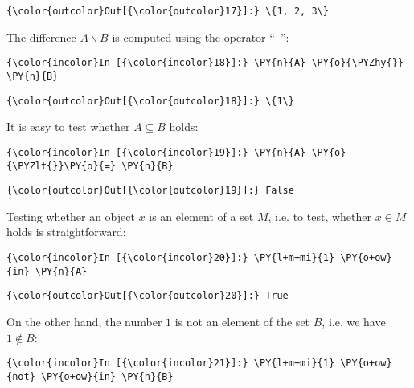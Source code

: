\begin{Verbatim}[commandchars=\\\{\}]
{\color{outcolor}Out[{\color{outcolor}17}]:} \{1, 2, 3\}
\end{Verbatim}       
The difference \(A \backslash B\) is computed using the operator ``\texttt{-}'':

\begin{Verbatim}[commandchars=\\\{\}]
{\color{incolor}In [{\color{incolor}18}]:} \PY{n}{A} \PY{o}{\PYZhy{}} \PY{n}{B}
\end{Verbatim}

\begin{Verbatim}[commandchars=\\\{\}]
{\color{outcolor}Out[{\color{outcolor}18}]:} \{1\}
\end{Verbatim}           
It is easy to test whether \(A \subseteq B\) holds:

\begin{Verbatim}[commandchars=\\\{\}]
{\color{incolor}In [{\color{incolor}19}]:} \PY{n}{A} \PY{o}{\PYZlt{}}\PY{o}{=} \PY{n}{B}
\end{Verbatim}

\begin{Verbatim}[commandchars=\\\{\}]
{\color{outcolor}Out[{\color{outcolor}19}]:} False
\end{Verbatim}           
Testing whether an object \(x\) is an element of a set \(M\), i.e. to
test, whether \(x \in M\) holds is straightforward:

\begin{Verbatim}[commandchars=\\\{\}]
{\color{incolor}In [{\color{incolor}20}]:} \PY{l+m+mi}{1} \PY{o+ow}{in} \PY{n}{A}
\end{Verbatim}

\begin{Verbatim}[commandchars=\\\{\}]
{\color{outcolor}Out[{\color{outcolor}20}]:} True
\end{Verbatim}          
On the other hand, the number \(1\) is not an element of the set \(B\),
i.e. we have \(1 \not\in B\):

\begin{Verbatim}[commandchars=\\\{\}]
{\color{incolor}In [{\color{incolor}21}]:} \PY{l+m+mi}{1} \PY{o+ow}{not} \PY{o+ow}{in} \PY{n}{B}
\end{Verbatim}


